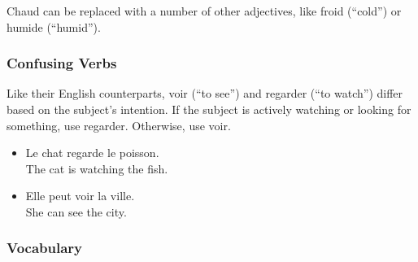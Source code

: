 Chaud can be replaced with a number of other adjectives, like froid (``cold'') or humide (``humid'').

\subsubsection{Confusing Verbs}

Like their English counterparts, voir (``to see'') and regarder (``to watch'') differ based on the subject's intention. If the subject is actively watching or looking for something, use regarder. Otherwise, use voir.

\begin{itemize}
  \item  Le chat regarde le poisson. \\ The cat is watching the fish.
  \item  Elle peut voir la ville. \\ She can see the city.
\end{itemize}

\subsubsection{Vocabulary}

